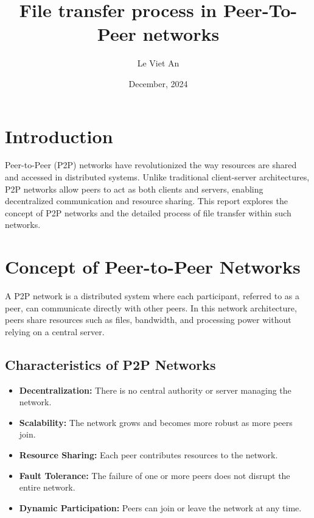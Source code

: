 \documentclass[12pt,a4paper]{article}
\begin{document}
\title{File transfer process in Peer-To-Peer networks}
\author{Le Viet An}
\date{December, 2024}
\maketitle

\tableofcontents
\newpage

\section{Introduction}

Peer-to-Peer (P2P) networks have revolutionized the way resources are shared and accessed in distributed systems. Unlike traditional client-server architectures, P2P networks allow peers to act as both clients and servers, enabling decentralized communication and resource sharing. This report explores the concept of P2P networks and the detailed process of file transfer within such networks.

\section{Concept of Peer-to-Peer Networks}

A P2P network is a distributed system where each participant, referred to as a peer, can communicate directly with other peers. In this network architecture, peers share resources such as files, bandwidth, and processing power without relying on a central server.

\subsection{Characteristics of P2P Networks}
\begin{itemize}
    \item \textbf{Decentralization:} There is no central authority or server managing the network.
    \item \textbf{Scalability:} The network grows and becomes more robust as more peers join.
    \item \textbf{Resource Sharing:} Each peer contributes resources to the network.
    \item \textbf{Fault Tolerance:} The failure of one or more peers does not disrupt the entire network.
    \item \textbf{Dynamic Participation:} Peers can join or leave the network at any time.
\end{itemize}
\end{document}
